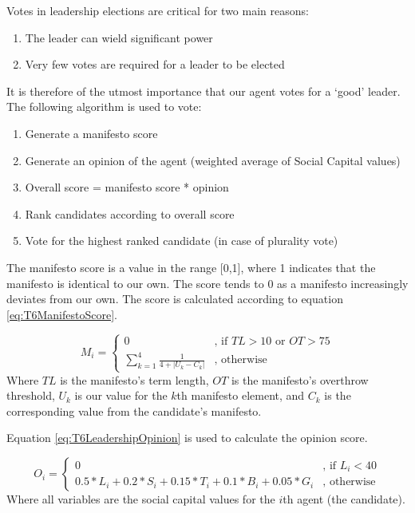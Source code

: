 Votes in leadership elections are critical for two main reasons:
\begin{enumerate}
    \item The leader can wield significant power
    \item Very few votes are required for a leader to be elected
\end{enumerate}
It is therefore of the utmost importance that our agent votes for a `good' leader. The following algorithm is used to vote:
\begin{enumerate}
    \item Generate a manifesto score
    \item Generate an opinion of the agent (weighted average of Social Capital values)
    \item Overall score = manifesto score * opinion
    \item Rank candidates according to overall score
    \item Vote for the highest ranked candidate (in case of plurality vote)
\end{enumerate}
The manifesto score is a value in the range [0,1], where 1 indicates that the manifesto is identical to our own. The score tends to 0 as a manifesto increasingly deviates from our own. The score is calculated according to equation \ref{eq:T6ManifestoScore}.

\begin{equation}\label{eq:T6ManifestoScore}
    M_{i}=\left\{
    	\begin{array}{ll}
    		0 & \mbox{, if } TL > 10 \mbox{ or } OT > 75 \\
    	  \sum_{k=1}^{4}\frac{1}{4+\left | U_{k} - C_{k} \right |} & \mbox{, otherwise} 
    	\end{array}\right.
\end{equation}
Where $TL$ is the manifesto's term length, $OT$ is the manifesto's overthrow threshold, $U_k$ is our value for 
the $k$th manifesto element, and $C_k$ is the corresponding value from the candidate's manifesto.

Equation \ref{eq:T6LeadershipOpinion} is used to calculate the opinion score.

\begin{equation}\label{eq:T6LeadershipOpinion}
    O_{i}=\left\{
    	\begin{array}{ll}
    		0 & \mbox{, if } L_{i} < 40 \\
    	  0.5 * L_{i} + 0.2 * S_{i} + 0.15 * T_{i} + 0.1 * B_{i} + 0.05 * G_{i} & \mbox{, otherwise} 
    	\end{array}\right.
\end{equation}
Where all variables are the social capital values for the $i$th agent (the candidate).


